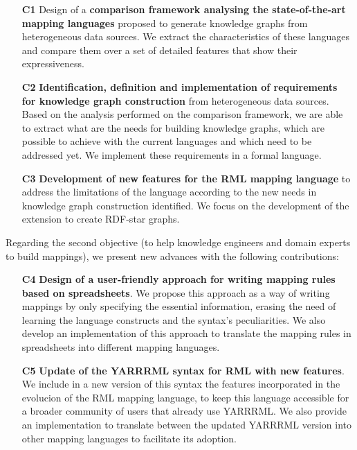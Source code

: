 \begin{enumerate}
    \item[\textbf{C1}] Design of a \textbf{comparison framework analysing the state-of-the-art mapping languages} proposed to generate knowledge graphs from heterogeneous data sources. We extract the characteristics of these languages and compare them over a set of detailed features that show their expressiveness. 
    
    \item[\textbf{C2}] \textbf{Identification, definition and implementation of requirements for knowledge graph construction} from heterogeneous data sources. Based on the analysis performed on the comparison framework, we are able to extract what are the needs for building knowledge graphs, which are possible to achieve with the current languages and which need to be addressed yet. We implement these requirements in a formal language. 
    
    \item[\textbf{C3}] \textbf{Development of new features for the RML mapping language} to address the limitations of the language according to the new needs in knowledge graph construction identified. We focus on the development of the extension to create RDF-star graphs. 
\end{enumerate}

Regarding the second objective (to help knowledge engineers and domain experts to build mappings), we present new advances with the following contributions:

\begin{enumerate}
    \item[\textbf{C4}] \textbf{Design of a user-friendly approach for writing mapping rules based on spreadsheets}. We propose this approach as a way of writing mappings by only specifying the essential information, erasing the need of learning the language constructs and the syntax's peculiarities. We also develop an implementation of this approach to translate the mapping rules in spreadsheets into different mapping languages. 
    \item[\textbf{C5}] \textbf{Update of the YARRRML syntax for RML with new features}. We include in a new version of this syntax the features incorporated in the evolucion of the RML mapping language, to keep this language accessible for a broader community of users that already use YARRRML. We also provide an implementation to translate between the updated YARRRML version into other mapping languages to facilitate its adoption.
\end{enumerate}

